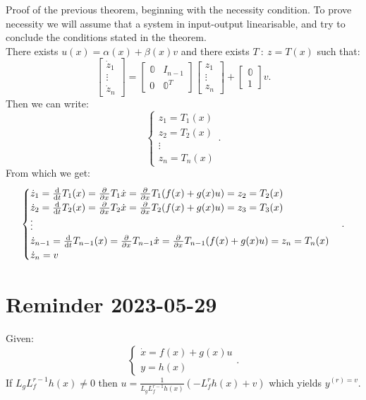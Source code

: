 \begin{myproof}
    Proof of the previous theorem, beginning with the necessity condition.
    To prove necessity we will assume that a system in input-output linearisable, and try to conclude the conditions stated in the theorem.\\
    There exists $u(x) = \alpha(x)+\beta(x)v$ and there exists  $T\: : \: z = T(x)$ such that:
    \[
    \begin{bmatrix}
        \dot{z}_1 \\
        \vdots\\
        \dot{z}_n
    \end{bmatrix} = \begin{bmatrix}
    \mathbb{0} & I_{n-1} \\
    0 & \mathbb{0}^{T}
    \end{bmatrix}\begin{bmatrix}
        z_1  \\
        \vdots\\
        z_n
    \end{bmatrix}
    + \begin{bmatrix}
        \mathbb{0}  \\
        1
    \end{bmatrix} v
    .\] 
    Then we can write:
    \[
    \begin{cases}
        z_1 = T_1(x)\\
        z_2 = T_2(x)\\
        \vdots \\
        z_n = T_n(x)
    \end{cases}
    .\] 
    From which we get:
    \[
        \begin{cases}
        \dot{z}_1 = \odv{}{t}T_1(x) = \pdv{}{x}T_1\dot{x} = \pdv{}{x}T_1(f(x)+g(x)u) = z_2=T_2(x)  \\
        \dot{z}_2 = \odv{}{t}T_2(x) = \pdv{}{x}T_2\dot{x} = \pdv{}{x}T_2(f(x)+g(x)u) = z_3=T_3(x) \\
        \vdots \\
        \dot{z}_{n-1} = \odv{}{t}T_{n-1}(x) = \pdv{}{x}T_{n-1}\dot{x} = \pdv{}{x}T_{n-1}(f(x)+g(x)u) = z_{n}=T_{n}(x) \\
        \dot{z}_n = v
        
            
        \end{cases}
    .\] 
\end{myproof}


\section{Reminder 2023-05-29}
Given:
\[
    \begin{cases}
        \dot{x} = f(x) + g(x)u\\
        y = h(x)
    \end{cases}
.\] 
If $L_gL_f^{r-1}h(x) \neq 0$ then $u = \frac{1}{L_gL_f^{r-1}h(x)}(-L_f^{r}h(x) + v)$ which yields $y^{(r) = v}$.

